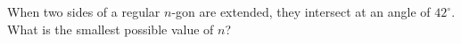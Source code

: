 When two sides of a regular $n$-gon are extended, they intersect at an angle of $42^{\circ}$. What is the smallest possible value of $n$?

